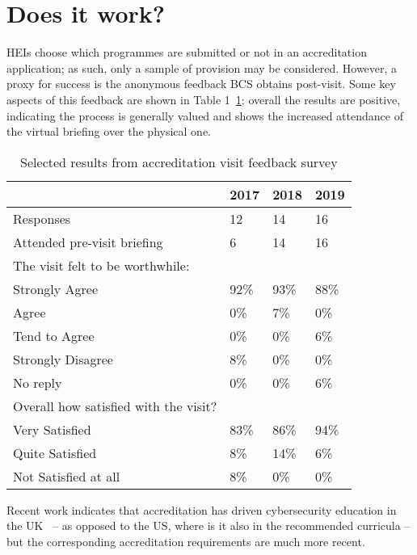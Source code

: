 \documentclass[sigconf]{acmart}
\begin{document}
\section {Does it work?}

HEIs choose which programmes are submitted or not in an accreditation
application; as such, only a sample of provision may be
considered. However, a proxy for success is the anonymous feedback BCS
obtains post-visit. Some key aspects of this feedback are shown in
Table 1~\ref{table:1}; overall the results are positive, indicating
the process is generally valued and shows the increased attendance of
the virtual briefing over the physical one.

\begin{table}[h!]
  \caption{Selected results from accreditation visit feedback survey}
  \label{table:1}
\begin{tabular}{ | p{5cm}|p{.75cm}|p{.75cm} |p{.75cm} |}
\hline
 & 2017 & 2018 & 2019   \\ \hline
Responses & 12 & 14 & 16   \\
\hline
Attended pre-visit briefing & 6 & 14 & 16   \\
\hline
The visit felt to be worthwhile: & & &  \\
Strongly Agree &92\% & 93\% &88\% \\
Agree &0\% & 7\% &0\% \\
Tend to Agree &0\% & 0\% &6\% \\
Strongly Disagree &8\% & 0\% &0\% \\
No reply &0\% & 0\% &6\% \\
\hline
Overall how satisfied with the visit? & & &  \\
Very Satisfied &83\% & 86\% &94\% \\
Quite Satisfied &8\% & 14\% &6\% \\
Not Satisfied at all &8\% & 0\% &0\% \\
\hline

\end{tabular}%
\end{table}

Recent work indicates that accreditation has driven cybersecurity
education in the UK~\cite{Cricketal2019} -- as opposed to the US,
where is it also in the recommended curricula -- but the
corresponding accreditation requirements are much more recent.
\end{document}
